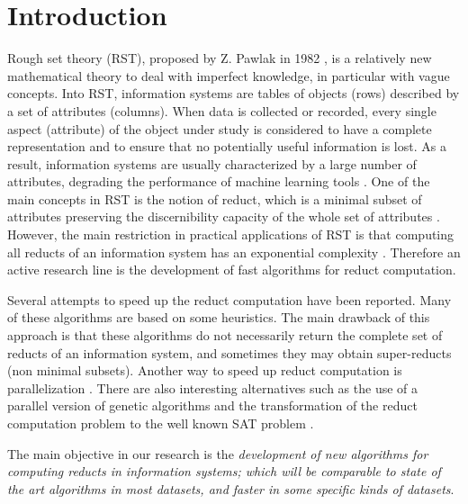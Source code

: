 \documentclass[authoryear,11pt]{elsarticle}
\begin{document}
\section{Introduction}
  Rough set theory (RST), proposed by Z. Pawlak in 1982 \citep{Pawlak81,Pawlak81-2,Pawlak82,Pawlak91}, 
  is a relatively new mathematical theory to deal with imperfect knowledge, in particular with vague 
  concepts. Into RST, information systems are tables of objects (rows) described by a set of attributes (columns). 
  When data is collected or recorded, every single aspect (attribute) of the object under study is considered 
  to have a complete representation and to ensure that no potentially useful information is lost.
  As a result, information systems are usually characterized by a large number of attributes,
  degrading the performance of machine learning tools \citep{Parthalain08}.
  One of the main concepts in RST is the notion of reduct, which is a minimal subset of attributes 
  preserving the discernibility capacity of the whole set of attributes \citep{Pawlak91}. 
  However, the main restriction in practical applications of RST is that computing all reducts of an information 
  system has an exponential complexity \citep{Skowron92}. Therefore an active research line is the development 
  of fast algorithms for reduct computation.
  
  Several attempts to speed up the reduct computation have been reported. Many of these algorithms are based on some heuristics. The main drawback of this approach is that these algorithms do not necessarily return the complete set of reducts of an information system, and sometimes they may obtain super-reducts (non minimal subsets). Another way to speed up reduct computation is parallelization \citep{Strakowski08}. There are also interesting alternatives such as the use of a parallel version of genetic algorithms \citep{Wroblewski98} and the transformation of the reduct computation problem to the well known SAT problem \citep{Jensen14}.  
  
  The main objective in our research is the \emph{development of new algorithms for computing reducts in  	information systems; which will be comparable to state of the art algorithms in most datasets, and faster in some specific kinds of datasets}. 
  
\end{document}
